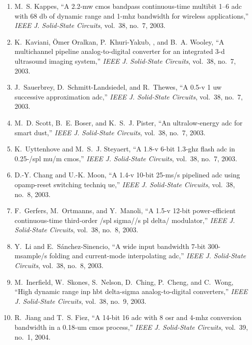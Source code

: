 \begin{enumerate}
\item
M.~S. Kappes, ``A 2.2-mw cmos bandpass continuous-time multibit 1–6 adc with
  68 db of dynamic range and 1-mhz bandwidth for wireless applications,''
  \emph{{IEEE} J. Solid-State Circuits}, vol.~38, no.~7, 2003.

\item
K.~Kaviani, Ömer Oralkan, P.~Khuri-Yakub, , and B.~A. Wooley, ``A multichannel
  pipeline analog-to-digital converter for an integrated 3-d ultrasound imaging
  system,'' \emph{{IEEE} J. Solid-State Circuits}, vol.~38, no.~7, 2003.

\item
J.~Sauerbrey, D.~Schmitt-Landsiedel, and R.~Thewes, ``A 0.5-v 1 uw successive
  approximation adc,'' \emph{{IEEE} J. Solid-State Circuits}, vol.~38, no.~7,
  2003.

\item
M.~D. Scott, B.~E. Boser, and K.~S.~J. Pister, ``An ultralow-energy adc for
  smart dust,'' \emph{{IEEE} J. Solid-State Circuits}, vol.~38, no.~7, 2003.

\item
K.~Uyttenhove and M.~S.~J. Steyaert, ``A 1.8-v 6-bit 1.3-ghz flash adc in
  0.25-/spl mu/m cmos,'' \emph{{IEEE} J. Solid-State Circuits}, vol.~38, no.~7,
  2003.

\item
D.-Y. Chang and U.-K. Moon, ``A 1.4-v 10-bit 25-ms/s pipelined adc using
  opamp-reset switching techniq ue,'' \emph{{IEEE} J. Solid-State Circuits},
  vol.~38, no.~8, 2003.

\item
F.~Gerfers, M.~Ortmanns, and Y.~Manoli, ``A 1.5-v 12-bit power-efficient
  continuous-time third-order /spl sigma//s pl delta/ modulator,'' \emph{{IEEE}
  J. Solid-State Circuits}, vol.~38, no.~8, 2003.

\item
Y.~Li and E.~Sánchez-Sinencio, ``A wide input bandwidth 7-bit 300-msample/s
  folding and current-mode interpolating adc,'' \emph{{IEEE} J. Solid-State
  Circuits}, vol.~38, no.~8, 2003.

\item
M.~Inerfield, W.~Skones, S.~Nelson, D.~Ching, P.~Cheng, and C.~Wong, ``High
  dynamic range inp hbt delta-sigma analog-to-digital converters,''
  \emph{{IEEE} J. Solid-State Circuits}, vol.~38, no.~9, 2003.

\item
R.~Jiang and T.~S. Fiez, ``A 14-bit 16 adc with 8 osr and 4-mhz conversion
  bandwidth in a 0.18-um cmos process,'' \emph{{IEEE} J. Solid-State Circuits},
  vol.~39, no.~1, 2004.


\end{enumerate}
